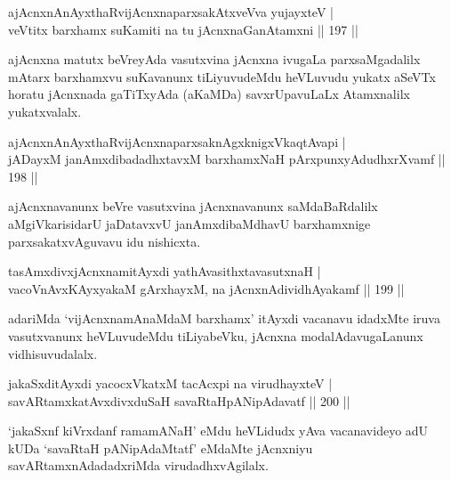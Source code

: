 \begin{shl}
ajAcnxnAnAyxthaRvijAcnxnaparxsakAtxveVva yujayxteV |\\
veVtitx barxhamx suKamiti na tu jAcnxnaGanAtamxni \hfill || 197 ||
\end{shl}

\begin{artha}
ajAcnxna matutx beVreyAda vasutxvina jAcnxna ivugaLa parxsaMgadalilx mAtarx barxhamxvu suKavanunx tiLiyuvudeMdu heVLuvudu yukatx aSeVTx horatu jAcnxnada gaTiTxyAda (aKaMDa) savxrUpavuLaLx Atamxnalilx yukatxvalalx.
\end{artha}


\begin{shl}
ajAcnxnAnAyxthaRvijAcnxnaparxsaknAgxknigxVkaqtAvapi |\\
jADayxM janAmxdibadadhxtavxM barxhamxNaH pArxpunxyAdudhxrXvamf \hfill || 198 ||
\end{shl}

\begin{artha}
ajAcnxnavanunx beVre vasutxvina jAcnxnavanunx saMdaBaRdalilx aMgiVkarisidarU jaDatavxvU janAmxdibaMdhavU barxhamxnige parxsakatxvAguvavu idu nishicxta.
\end{artha}

\begin{shl}
tasAmxdivxjAcnxnamitAyxdi yathAvasithxtavasutxnaH |\\
vacoV\s nAvxKAyxyakaM gArxhayxM, na jAcnxnAdividhAyakamf \hfill || 199 ||
\end{shl}

\begin{artha}
adariMda `vijAcnxnamAnaMdaM barxhamx' itAyxdi vacanavu idadxMte iruva vasutxvanunx heVLuvudeMdu tiLiyabeVku, jAcnxna modalAdavugaLanunx vidhisuvudalalx.
\end{artha}

\begin{shl}
jakaSxditAyxdi yacocxVkatxM tacAcxpi na virudhayxteV |\\
savARtamxkatAvxdivxduSaH savaRtaHpANipAdavatf \hfill || 200 || 
\end{shl}

\begin{artha}
`jakaSxnf kiVrxdanf ramamANaH' eMdu heVLidudx yAva vacanavideyo adU kUDa `savaRtaH pANipAdaMtatf' eMdaMte jAcnxniyu savARtamxnAdadadxriMda virudadhxvAgilalx. 
\end{artha}

